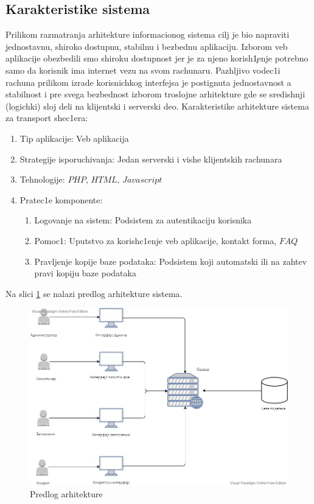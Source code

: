 \subsection{Karakteristike sistema}
Prilikom razmatranja arhitekture informacionog sistema cilj je bio napraviti jednostavnu, shiroko dostupnu, stabilnu i bezbednu aplikaciju. Izborom veb aplikacije obezbedili smo shiroku dostupnost jer je za njeno korish\c1enje potrebno samo da korisnik ima
internet vezu na svom rachunaru. Pazhljivo vodec1i rachuna prilikom izrade korisnichkog
interfejsa je postignuta jednostavnost a stabilnost i pre svega bezbednost izborom
troslojne arhitekture gde se sredishnji (logichki) sloj deli na klijentski i serverski deo.
Karakteristike arhitekture sistema za transport shec1era:
\begin{enumerate}
    \item  Tip aplikacije: Veb aplikacija
    \item Strategije isporuchivanja: Jedan serverski i vishe klijent\-skih rachunara
    \item Tehnologije: $PHP$, $HTML$, $Javascript$
    \item Pratec1e komponente:

    \begin{enumerate}
        \item  Logovanje na sistem: Podsistem za autentikaciju korisnika
        \item Pomoc1: Uput\-stvo za korish\-c1enje veb aplikacije, kontakt forma, $FAQ$
        \item Pravljenje kopije baze podataka: Podsistem koji automatski ili na zahtev pravi kopiju baze podataka
        \end{enumerate}

\end{enumerate}
Na slici \ref{fig:arh} se nalazi predlog arhitekture sistema.

\begin{figure}[H]
    \centering
    \includegraphics[width=12cm]{Slike/Arhitektura/arhitektura .jpg}
    \caption{Predlog arhitekture}
    \label{fig:arh}
\end{figure}



